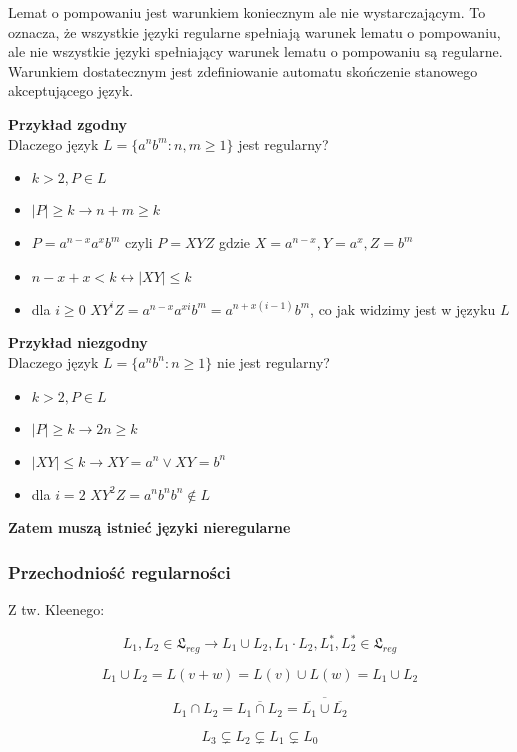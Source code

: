 \documentclass{../notatki}
\begin{document}
Lemat o pompowaniu jest warunkiem koniecznym ale nie wystarczającym.
To oznacza, że wszystkie języki regularne spełniają warunek lematu o
pompowaniu, ale nie wszystkie języki spełniający warunek lematu o
pompowaniu są regularne.
Warunkiem dostatecznym jest zdefiniowanie automatu skończenie
stanowego akceptującego język.

\textbf{Przykład zgodny} \\
Dlaczego język $L = \{a^nb^m : n,m \ge 1\}$ jest regularny?

\begin{itemize}
  \item $k > 2, P \in L$
  \item $|P| \ge k \rightarrow n + m \ge k$
  \item $P = a^{n - x}a^xb^m$ czyli $P = XYZ$ gdzie $X = a^{n - x}, Y
    = a^x, Z = b^m$
  \item $n - x + x < k \leftrightarrow |XY| \le k$
  \item dla $i \ge 0$ $XY^iZ = a^{n - x}a^{xi}b^m = a^{n + x(i -
    1)}b^m$, co jak widzimy jest w języku $L$
\end{itemize}
\textbf{Przykład niezgodny} \\
Dlaczego język $L = \{a^nb^n : n \ge 1\}$ nie jest regularny?

\begin{itemize}
  \item $k > 2, P \in L$
  \item $|P| \ge k \rightarrow 2n \ge k$
  \item $|XY| \le k \rightarrow XY = a^n \vee XY = b^n$
  \item dla $i = 2$ $XY^2Z = a^nb^nb^n \notin L$
\end{itemize}
\textbf{Zatem muszą istnieć języki nieregularne}

\subsubsection{Przechodniość regularności}

Z tw. Kleenego:

$$L_1,L_2 \in \mathfrak{L}_{reg} \rightarrow L_1 \cup L_2, L_1 \cdot
L_2, L_1^*, L_2^* \in \mathfrak{L}_{reg}$$

$$
L_1 \cup L_2 = L(v + w) = L(v) \cup L(w) = L_1 \cup L_2
$$

$$
L_1 \cap L_2 = \overline{L_1 \cap L_2} = \overline{\overline{L_1}
\cup \overline{L_2}}
$$

$$
L_3 \subsetneq L_2 \subsetneq L_1 \subsetneq L_0
$$
\end{document}
